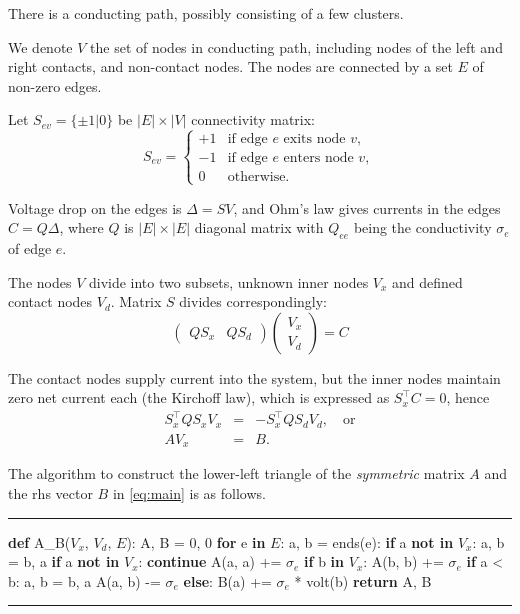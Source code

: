 \documentclass[12pt]{article}
\begin{document}
\vskip1cm
There is a conducting path, possibly consisting of a few clusters.

We denote $V$ the set of nodes in conducting path,
including nodes of the left and right contacts, 
and non-contact nodes. The nodes are connected by 
a set $E$ of non-zero edges.

Let $S_{ev}=\{\pm1|0\}$ be $|E|\times|V|$ connectivity matrix: 
\begin{equation}
S_{ev} = \left\{
\begin{array}{rl}
+1&\mbox{if edge $e$ exits node $v$},\\
-1&\mbox{if edge $e$ enters node $v$},\\
0&\mbox{otherwise.}
\end{array}
\right.
\end{equation}

Voltage drop on the edges is $\Delta=SV$, and Ohm's law gives 
currents in the edges $C=Q\Delta$, where $Q$ is 
$|E|\times|E|$ diagonal matrix with $Q_{ee}$ being 
the conductivity $\sigma_e$ of edge $e$.

The nodes $V$ divide into two subsets, unknown inner nodes $V_x$
and defined contact nodes $V_d$. Matrix $S$ divides correspondingly:
\begin{equation}
\begin{pmatrix}QS_x&QS_d\end{pmatrix}
\begin{pmatrix}V_x\\ V_d\end{pmatrix} = C
\end{equation}

The contact nodes supply current into the system, 
but the inner nodes maintain zero net current
each (the Kirchoff law), which is expressed as $S_x^\top C=0$, hence
\begin{eqnarray}
S^\top_xQS_xV_x &=& -S^\top_xQS_dV_d,\quad\mbox{or}\\
AV_x&=&B.\label{eq:main}
\end{eqnarray}

The algorithm 
to construct the lower-left triangle of the \emph{symmetric} matrix $A$
and the rhs vector $B$ in \eqref{eq:main} is as follows.

\iffalse
A_{ab} = sum_e {
+[exits(e,a)][exits(e,b)]*sigma(e) 
-[exits(e,a)][enters(e,b)]*sigma(e) 
-[enters(e,a)][exits(e,b)]*sigma(e) 
+[enters(e,a)][enters(e,b)]*sigma(e) 
}
\fi

\def\x#1{\hspace{#1cm}}
\rule{\textwidth}{1pt}
\bgroup\obeylines\ttfamily
\textbf{def} A\_B($V_x$, $V_d$, $E$):
\x1 A, B = 0, 0
\x1 \textbf{for} e \textbf{in} $E$:
\x2   a, b = ends(e):
\x2   \textbf{if} a \textbf{not in} $V_x$: a, b = b, a
\x2   \textbf{if} a \textbf{not in} $V_x$: \textbf{continue}
\x2   A(a, a) += $\sigma_e$
\x2   \textbf{if} b \textbf{in} $V_x$:
\x3      A(b, b) += $\sigma_e$
\x3      \textbf{if} a < b: a, b = b, a
\x3      A(a, b) -= $\sigma_e$
\x2   \textbf{else}:
\x3      B(a) += $\sigma_e$ * volt(b)
\x1 \textbf{return} A, B
\egroup
\rule{\textwidth}{1pt}
\end{document}
